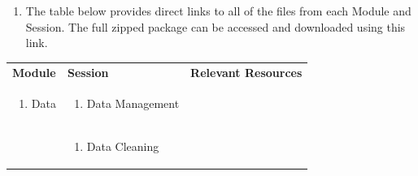 \documentclass[
]{book}
\providecommand{\tightlist}{%
  \setlength{\itemsep}{0pt}\setlength{\parskip}{0pt}}
\begin{document}
\begin{enumerate}
\def\labelenumi{\arabic{enumi}.}
\tightlist
\item
  The table below provides direct links to all of the files from each Module and Session. The full zipped package can be accessed and downloaded using this link.
\end{enumerate}

\begin{longtable}[]{@{}lll@{}}
\toprule
\endhead
\begin{minipage}[t]{0.15\columnwidth}\raggedright
\textbf{Module}\strut
\end{minipage} & \begin{minipage}[t]{0.34\columnwidth}\raggedright
\textbf{Session}\strut
\end{minipage} & \begin{minipage}[t]{0.42\columnwidth}\raggedright
\textbf{Relevant Resources}\strut
\end{minipage}\tabularnewline
\begin{minipage}[t]{0.15\columnwidth}\raggedright
\begin{enumerate}
\def\labelenumi{\arabic{enumi}.}
\setcounter{enumi}{1}
\tightlist
\item
  Data
\end{enumerate}\strut
\end{minipage} & \begin{minipage}[t]{0.34\columnwidth}\raggedright
\begin{enumerate}
\def\labelenumi{\arabic{enumi}.}
\tightlist
\item
  Data Management
\end{enumerate}\strut
\end{minipage} & \begin{minipage}[t]{0.42\columnwidth}\raggedright
\strut
\end{minipage}\tabularnewline
\begin{minipage}[t]{0.15\columnwidth}\raggedright
\strut
\end{minipage} & \begin{minipage}[t]{0.34\columnwidth}\raggedright
\begin{enumerate}
\def\labelenumi{\arabic{enumi}.}
\setcounter{enumi}{1}
\tightlist
\item
  Data Cleaning
\end{enumerate}\strut
\end{minipage} & \begin{minipage}[t]{0.42\columnwidth}\raggedright
\strut

\end{minipage}
\end{longtable}
\end{document}
